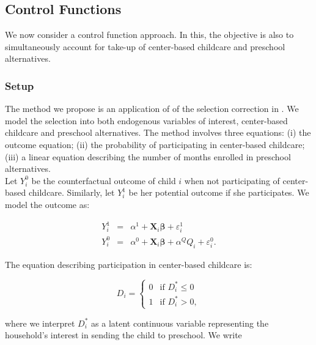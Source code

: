 \begin{appendices}
\subsection{Control Functions}

\noindent We now consider a control function approach. In this, the objective is also to simultaneously account for take-up of center-based childcare and preschool alternatives. 

\subsubsection{Setup}

\noindent The method we propose is an application of of the selection correction in \citet{Heckman_1979_Econometrica}. We model the selection into both endogenous variables of interest, center-based childcare and preschool alternatives. The method involves three equations: (i) the outcome equation; (ii) the probability of participating in center-based childcare; (iii) a linear equation describing the number of months enrolled in preschool alternatives.\\

\noindent Let $Y^{0}_{i}$ be the counterfactual outcome of child $i$ when not participating of center-based childcare. Similarly, let $Y^{1}_{i}$ be her potential outcome if she participates. We model the outcome as: 
 
\begin{eqnarray}
Y_{i}^1 &=& \alpha^1+\mathbf{X}_{i} \mathbf{\beta}                 +\varepsilon_i^1 \nonumber  \\
Y_{i}^0 &=& \alpha^0+\mathbf{X}_{i} \mathbf{\beta} + \alpha^Q Q_i+\varepsilon_i^0.  \label{eq:potout}
\end{eqnarray}

\noindent The equation describing participation in center-based childcare is: 

\begin{equation}
D_{i} = \left\{
        \begin{array}{ll}
        	0 &\text{if } D_{i}^* \leq  0 \\
            1 &\text{if } D_{i}^* > 0, \label{eq:sel1}
        \end{array}
    \right. 
\end{equation}

\noindent where we interpret $D_{i}^*$ as a latent continuous variable representing the household's interest in sending the child to preschool. We write


\end{appendices}
